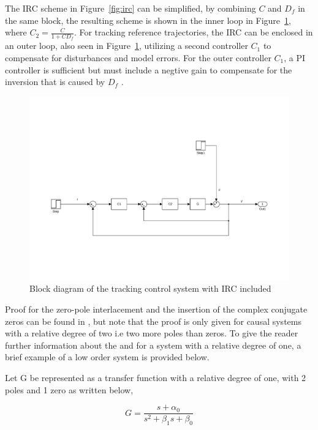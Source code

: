 The IRC scheme in Figure~\ref{fig:irc} can be simplified, by combining $C$ and $D_f$ in the same block, the resulting scheme is shown in the inner loop in Figure~\ref{fig:irc_int}, where $C_2 = \frac{C}{1+CD_f}$. For tracking reference trajectories, the IRC can be enclosed in an outer loop, also seen in Figure~\ref{fig:irc_int}, utilizing a second controller $C_1$ to compensate for disturbances and model errors. For the outer controller $C_1$, a PI controller is sufficient but must include a negtive gain to compensate for the inversion that is caused by $D_f$ \citep{gu:2014}.

\begin{figure}[h]
  \centering %
  \includegraphics[width=1\textwidth, trim=4cm 5cm 3.6cm 9.5cm, clip=true]{fig/matlab/irc_int}
  \caption{\label{fig:irc_int}Block diagram of the tracking control system with IRC included}
\end{figure}

Proof for the zero-pole interlacement and the insertion of the complex conjugate zeros can be found in \citep{Aphale:2007}, but note that the proof is only given for causal systems with a relative degree of two i.e two more poles than zeros. To give the reader further information about the \abbrIRC and for a system with a relative degree of one, a brief example of a low order system is provided below.

Let G be represented as a transfer function with a relative degree of one, with 2 poles and 1 zero as written below,

\begin{equation}
  \label{eq:irc_sys}
  G = \frac{s + \alpha_0}{s^2 + \beta_1s + \beta_0}
\end{equation}

